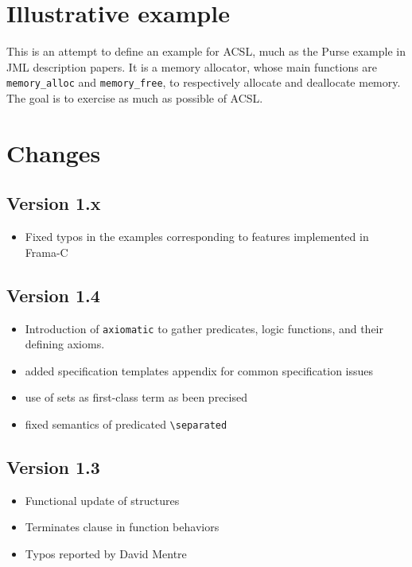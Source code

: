 \documentclass[a4paper,11pt,twoside,openright,web]{frama-c-book}
\begin{document}






\section{Illustrative example}

This is an attempt to define an example for ACSL, much as the Purse
example in JML description papers.  It is a memory allocator, whose
main functions are \lstinline|memory_alloc| and \lstinline|memory_free|, to
respectively allocate and deallocate memory.  The goal is to exercise
as much as possible of ACSL.

%

\section{Changes}

\subsection{Version 1.x}
\begin{itemize}
\item Fixed typos in the examples corresponding to features
  implemented in Frama-C
\end{itemize}

\subsection{Version 1.4}
\begin{itemize}
\item Introduction of \lstinline|axiomatic| to gather predicates, logic
  functions, and their defining axioms.
\item added specification templates appendix for common specification issues
\item use of sets as first-class term as been precised
\item fixed semantics of predicated \lstinline|\separated|
\end{itemize}

\subsection{Version 1.3}
\begin{itemize}
\item Functional update of structures
\item Terminates clause in function behaviors
\item Typos reported by David Mentre

\end{itemize}
\end{document}
